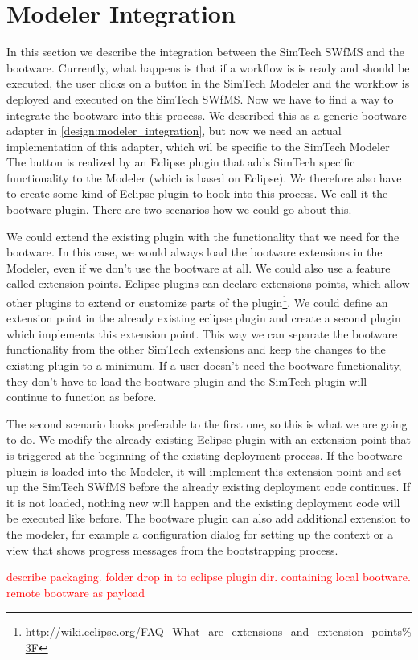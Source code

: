 \section{Modeler Integration}
\label{implementation:modeler_integration}

In this section we describe the integration between the SimTech SWfMS and the bootware.
Currently, what happens is that if a workflow is is ready and should be executed, the user clicks on a button in the SimTech Modeler and the workflow is deployed and executed on the SimTech SWfMS.
Now we have to find a way to integrate the bootware into this process.
We described this as a generic bootware adapter in \autoref{design:modeler_integration}, but now we need an actual implementation of this adapter, which wil be specific to the SimTech Modeler
The button is realized by an Eclipse plugin that adds SimTech specific functionality to the Modeler (which is based on Eclipse).
We therefore also have to create some kind of Eclipse plugin to hook into this process.
We call it the bootware plugin.
There are two scenarios how we could go about this.

We could extend the existing plugin with the functionality that we need for the bootware.
In this case, we would always load the bootware extensions in the Modeler, even if we don't use the bootware at all.
We could also use a feature called extension points.
Eclipse plugins can declare extensions points, which allow other plugins to extend or customize parts of the plugin\footnote{\url{http://wiki.eclipse.org/FAQ_What_are_extensions_and_extension_points\%3F}}.
We could define an extension point in the already existing eclipse plugin and create a second plugin which implements this extension point.
This way we can separate the bootware functionality from the other SimTech extensions and keep the changes to the existing plugin to a minimum.
If a user doesn't need the bootware functionality, they don't have to load the bootware plugin and the SimTech plugin will continue to function as before.

The second scenario looks preferable to the first one, so this is what we are going to do.
We modify the already existing Eclipse plugin with an extension point that is triggered at the beginning of the existing deployment process.
If the bootware plugin is loaded into the Modeler, it will implement this extension point and set up the SimTech SWfMS before the already existing deployment code continues.
If it is not loaded, nothing new will happen and the existing deployment code will be executed like before.
The bootware plugin can also add additional extension to the modeler, for example a configuration dialog for setting up the context or a view that shows progress messages from the bootstrapping process.

\textcolor{red}{describe packaging. folder drop in to eclipse plugin dir. containing local bootware. remote bootware as payload}
